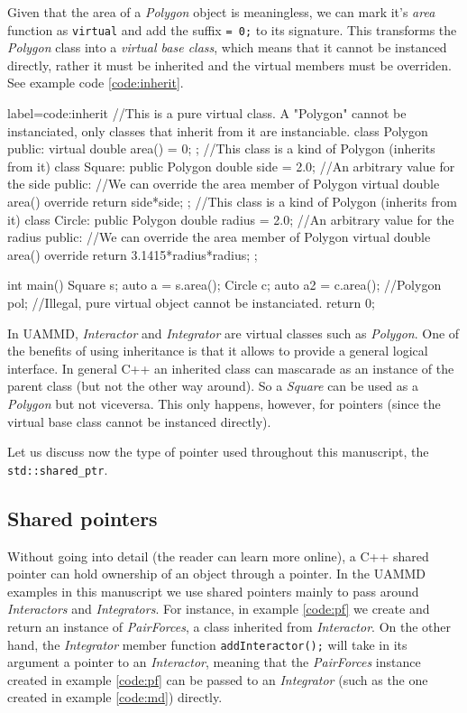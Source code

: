 \documentclass[ twoside,openright,titlepage,numbers=noenddot,%
headinclude,footinclude,cleardoublepage=empty,abstract=on,
BCOR=5mm,paper=a4,fontsize=11pt, dvipsnames
]{scrreprt}
\def\ucpp{uammd_cpp_lexer.py:UAMMDCppLexer -x}
\newcommand{\uammd}{\gls{UAMMD}\xspace}
\begin{document}
Given that the area of a \emph{Polygon} object is meaningless, we can mark it's \emph{area} function as \texttt{virtual} and add the suffix \texttt{= 0;} to its signature. This transforms the \emph{Polygon} class into a \emph{virtual base class}, which means that it cannot be instanced directly, rather it must be inherited and the virtual members must be overriden. See example code \ref{code:inherit}.
\begin{code2} {label=code:inherit}
  //This is a pure virtual class. A "Polygon" cannot be instanciated, only classes that inherit from it are instanciable.
  class Polygon{
    public:
    virtual double area() = 0;
  };
  //This class is a kind of Polygon (inherits from it)
  class Square: public Polygon{
    double side = 2.0; //An arbitrary value for the side
    public:
    //We can override the area member of Polygon
    virtual double area() override{
      return side*side;
    }
  };
  //This class is a kind of Polygon (inherits from it)
  class Circle: public Polygon{
    double radius = 2.0; //An arbitrary value for the radius
    public:
    //We can override the area member of Polygon
    virtual double area() override{
      return 3.1415*radius*radius;
    }
  };

  int main(){
    Square s;
    auto a = s.area();
    Circle c;
    auto a2 = c.area();
    //Polygon pol; //Illegal, pure virtual object cannot be instanciated.
    return 0;  
  }
\end{code2}

In \uammd, \emph{Interactor} and \emph{Integrator} are virtual classes such as \emph{Polygon}. One of the benefits of using inheritance is that it allows to provide a general logical interface. In general C++ an inherited class can mascarade as an instance of the parent class (but not the other way around). So a \emph{Square} can be used as a \emph{Polygon} but not viceversa. This only happens, however, for pointers (since the virtual base class cannot be instanced directly).

Let us discuss now the type of pointer used throughout this manuscript, the \texttt{std::shared_ptr}.

\subsection*{Shared pointers}
Without going into detail (the reader can learn more online), a C++ shared pointer can hold ownership of an object through a pointer. In the \uammd examples in this manuscript we use shared pointers mainly to pass around \emph{Interactors} and \emph{Integrators}. For instance, in example \ref{code:pf} we create and return an instance of \emph{PairForces}, a class inherited from \emph{Interactor}. On the other hand, the \emph{Integrator} member function \texttt{addInteractor();} will take in its argument a pointer to an \emph{Interactor}, meaning that the \emph{PairForces} instance created in example \ref{code:pf} can be passed to an \emph{Integrator} (such as the one created in example \ref{code:md}) directly.
\end{document}
